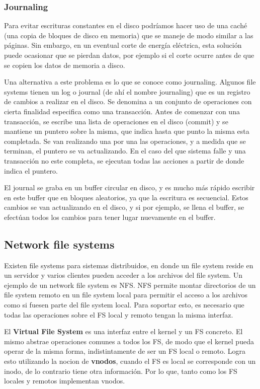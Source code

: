 \documentclass{article}
\begin{document}
\subsubsection{Journaling}

Para evitar escrituras constantes en el disco podríamos hacer uso de una cach\'e (una copia de bloques de disco en memoria) que se maneje de modo similar a las p\'aginas. Sin embargo, en un eventual corte de energ\'ia el\'ectrica, esta solución puede ocasionar que se pierdan datos, por ejemplo si el corte ocurre antes de que se copien los datos de memoria a disco.

Una alternativa a este problema es lo que se conoce como journaling. Algunos file systems tienen un log o journal (de ah\'i el nombre journaling) que es un registro de cambios a realizar en el disco. Se denomina a un conjunto de operaciones con cierta finalidad especifica como una transacción. Antes de comenzar con una transacción, se escribe una lista de operaciones en el disco (commit) y se mantiene un puntero sobre la misma, que indica hasta que punto la misma esta completada. Se van realizando una por una las operaciones, y a medida que se terminan, el puntero se va actualizando. En el caso del que sistema falle y una transacción no este completa, se ejecutan todas las acciones a partir de donde indica el puntero.

El journal se graba en un buffer circular en disco, y es mucho m\'as r\'apido escribir en este buffer que en bloques aleatorios, ya que la escritura es secuencial. Estos cambios se van actualizando en el disco, y si por ejemplo, se llena el buffer, se efectúan todos los cambios para tener lugar nuevamente en el buffer.

\subsection{Network file systems}

Existen file systems para sistemas distribuidos, en donde un file system reside en un servidor y varios clientes pueden acceder a los archivos del file system. Un ejemplo de un network file system es NFS. NFS permite montar directorios de un file system remoto en un file system local para permitir el acceso a los archivos como si fuesen parte del file system local. Para soportar esto, es necesario que todas las operaciones sobre el FS local y remoto tengan la misma interfaz.

El \textbf{Virtual File System} es una interfaz entre el kernel y un FS concreto. El mismo abstrae operaciones comunes a todos los FS, de modo que el kernel pueda operar de la misma forma, indistintamente de ser un FS local o remoto. Logra esto utilizando la nocion de \textbf{vnodos}, cuando el FS es local se corresponde con un inodo, de lo contrario tiene otra información. Por lo que, tanto como los FS locales y remotos implementan vnodos.
\end{document}
